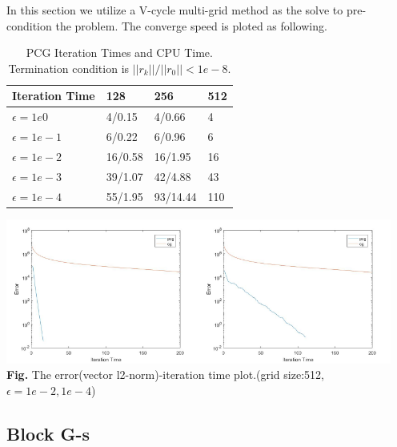 \documentclass[12pt]{amsart}
\begin{document}
In this section we utilize a V-cycle multi-grid method as the solve to pre-condition the problem. The converge speed is ploted as following.

\begin{table}[]
	\centering
	\caption{PCG Iteration Times and CPU Time. Termination condition is $||r_k||/||r_0||<1e-8$.}
	\label{pcg}
	\begin{tabular}{|l||lll|}
		\hline\hline
		Iteration Time & 128 & 256 & 512 \\ \hline\hline
		$\epsilon=1e0$            & 4/0.15   & 4/0.66   & 4   \\ \hline
		$\epsilon=1e-1$           & 6/0.22   & 6/0.96   & 6   \\ \hline
		$\epsilon=1e-2$          & 16/0.58  & 16/1.95  & 16  \\ \hline
		$\epsilon=1e-3$           & 39/1.07  & 42/4.88  & 43  \\ \hline
		$\epsilon=1e-4$           & 55/1.95  & 93/14.44  & 110 \\ \hline
	\end{tabular}
\end{table}

\begin{center}
	\includegraphics[width=2.5in]{plot.jpg}\includegraphics[width=2.5in]{plot2.jpg}\\
	\textbf{Fig.} The error(vector l2-norm)-iteration time plot.(grid size:512, $\epsilon=1e-2,1e-4$)
\end{center}

\subsection{Block G-s}
\end{document}
